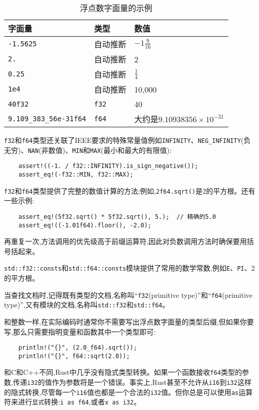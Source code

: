 \begin{table}[htbp]
    \centering
    \caption{浮点数字面量的示例}
    \label{t3-9}
    \begin{tabular}{lll}
        \hline
        \textbf{字面量} & \textbf{类型} & \textbf{数值} \\
        \hline
        \texttt{-1.5625}    & 自动推断  & $-1\frac{9}{16}$  \\
        \rowcolor{tablecolor}
        \texttt{2.}         & 自动推断  & 2 \\
        \texttt{0.25}       & 自动推断  & $\frac{1}{4}$   \\
        \rowcolor{tablecolor}
        \texttt{1e4}        & 自动推断  & 10,000    \\
        \texttt{40f32}      & \texttt{f32}  & 40    \\
        \rowcolor{tablecolor}
        \texttt{9.109\_383\_56e-31f64} & \texttt{f64} & 大约是$9.10938356\times10^{-31}$ \\
    \end{tabular}
\end{table}

\texttt{f32}和\texttt{f64}类型还关联了IEEE要求的特殊常量值例如\texttt{INFINITY}、\texttt{NEG\_INFINITY}(负无穷)、\texttt{NAN}(非数值)、\texttt{MIN}和\texttt{MAX}(最小和最大的有限值):
\begin{verbatim}
    assert!((-1. / f32::INFINITY).is_sign_negative());
    assert_eq!(-f32::MIN, f32::MAX);
\end{verbatim}
\texttt{f32}和\texttt{f64}类型提供了完整的数值计算的方法;例如,\texttt{2f64.sqrt()}是2的平方根。还有一些示例:
\begin{verbatim}
    assert_eq!(5f32.sqrt() * 5f32.sqrt(), 5.);  // 精确的5.0
    assert_eq!((-1.01f64).floor(), -2.0);
\end{verbatim}

再重复一次,方法调用的优先级高于前缀运算符,因此对负数调用方法时确保要用括号括起来。

\texttt{std::f32::consts}和\texttt{std::f64::consts}模块提供了常用的数学常数,例如\texttt{E}、\texttt{PI}、2的平方根。

当查找文档时,记得既有类型的文档,名称叫“\texttt{f32}(primitive type)”和“\texttt{f64}(primitive type)”,又有模块的文档,名称叫\texttt{std::f32}和\texttt{std::f64}。

和整数一样,在实际编码时通常你不需要写出浮点数字面量的类型后缀,但如果你要写,那么只需要指明变量和函数其中一个类型即可:
\begin{verbatim}
    println!("{}", (2.0_f64).sqrt());
    println!("{}", f64::sqrt(2.0));
\end{verbatim}
和C和C++不同,Rust中几乎没有隐式类型转换。如果一个函数接收\texttt{f64}类型的参数,传递\texttt{i32}的值作为参数将是一个错误。事实上,Rust甚至不允许从\texttt{i16}到\texttt{i32}这样的隐式转换,尽管每一个\texttt{i16}值也都是一个合法的\texttt{i32}值。但你总是可以使用\texttt{as}运算符来进行\texttt{显式}转换:\texttt{i as f64},或者\texttt{x as i32}。

